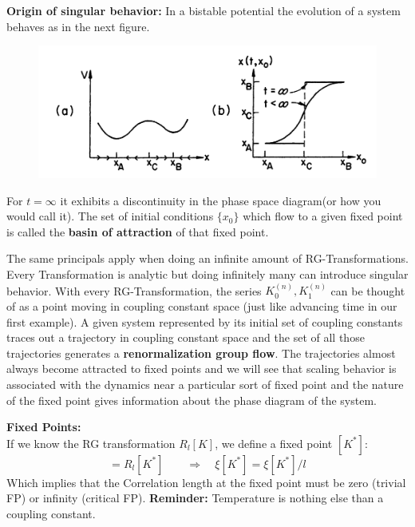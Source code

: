 	\textbf{Origin of singular behavior:} In a bistable potential the evolution of a system behaves as in the next figure.
	\begin{figure}[htp]
		\centering
		\includegraphics[width=13cm]{graphics/Bistable Evolution.png}
	\end{figure}
	For  $t=\infty$ it exhibits a discontinuity in the phase space diagram(or how you would call it). The set of initial conditions $\lbrace x_0 \rbrace$ which flow to a given fixed point is called the \textbf{basin of attraction} of that fixed point.
	
	The same principals apply when doing an infinite amount of RG-Transformations. Every Transformation is analytic but doing infinitely many can introduce singular behavior. With every RG-Transformation, the series $K_0^{(n)},K_1^{(n)} $ can be thought of as a point moving in coupling constant space (just like advancing time in our first example). A given system represented by its initial set of coupling constants traces out a trajectory in coupling constant space and the set of all those trajectories generates a \textbf{renormalization group flow}. The trajectories almost always become attracted to fixed points and we will see that scaling behavior is associated with the dynamics near a particular sort of fixed point and the nature of the fixed point gives information about the phase diagram of the system.
	
	\textbf{Fixed Points:} \\
	If we know the RG transformation $R_l[K]$, we define a fixed point $[K^*]$:
	\begin{equation}
		[K^*] =	R_l[K^*] \qquad \Rightarrow \quad \xi[K^*]  =	\xi[K^*] /	l
	\end{equation}
	Which implies that the Correlation length at the fixed point must be zero (trivial FP) or infinity (critical FP).
	\textbf{Reminder:} Temperature is nothing else than a coupling constant.
	
